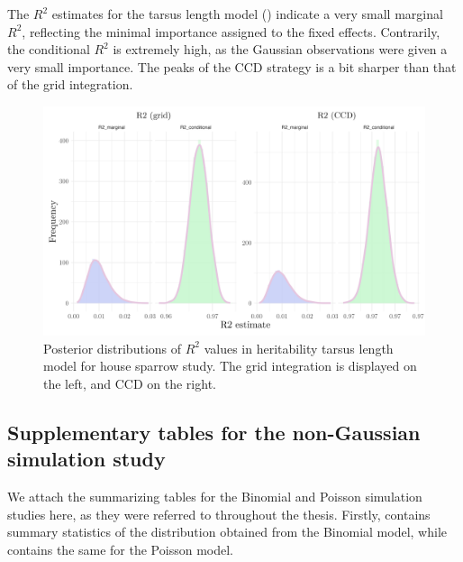 The $R^2$ estimates for the tarsus length model () indicate a very small marginal $R^2$, reflecting the minimal importance assigned to the fixed effects. Contrarily, the conditional $R^2$ is extremely high, as the Gaussian observations were given a very small importance. The peaks of the CCD strategy is a bit sharper than that of the grid integration. 
\begin{figure}[H]%
  \centering
  \includegraphics[width=1\linewidth]{Figures/House sparrow study/Tarsus_r2.png}
  \caption[Posterior distributions of $R^2$ values in tarsus length model for house sparrow study]{Posterior distributions of $R^2$ values in heritability tarsus length model for house sparrow study. The grid integration is displayed on the left, and CCD on the right.}
  \label{fig:tarsus_r2}
\end{figure}

\subsection*{Supplementary tables for the non-Gaussian simulation study}
We attach the summarizing tables for the Binomial and Poisson simulation studies here, as they were referred to throughout the thesis. Firstly,  contains summary statistics of the distribution obtained from the Binomial model, while  contains the same for the Poisson model.

